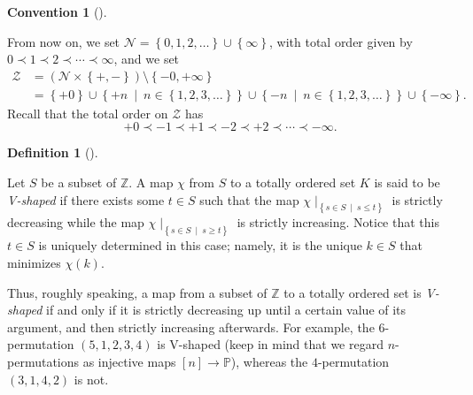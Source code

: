 \documentclass[numbers=enddot,12pt,final,onecolumn,notitlepage]{scrartcl}%
\theoremstyle{definition}
\newtheorem{defi}[theo]{Definition}
\newenvironment{definition}[1][]
{\begin{defi}[#1]\begin{leftbar}}
{\end{leftbar}\end{defi}}
\newtheorem{conv}[theo]{Convention}
\newenvironment{convention}[1][]
{\begin{conv}[#1]\begin{leftbar}}
{\end{leftbar}\end{conv}}
\newenvironment{convention}[1][Convention]{\noindent\textbf{#1.} }{\ \rule{0.5em}{0.5em}}
\newcommand{\ZZ}{\mathbb{Z}}
\begin{document}
\begin{convention}
From now on, we set $\mathcal{N}=\left\{  0,1,2,\ldots\right\}  \cup\left\{
\infty\right\}  $, with total order given by $0\prec1\prec2\prec\cdots
\prec\infty$, and we set
\begin{align*}
\mathcal{Z}  &  =\left(  \mathcal{N}\times\left\{  +,-\right\}  \right)
\setminus\left\{  -0,+\infty\right\} \\
&  =\left\{  +0\right\}  \cup\left\{  +n\ \mid\ n\in\left\{  1,2,3,\ldots
\right\}  \right\}  \cup\left\{  -n\ \mid\ n\in\left\{  1,2,3,\ldots\right\}
\right\}  \cup\left\{  -\infty\right\}  .
\end{align*}
Recall that the total order on $\mathcal{Z}$ has%
\[
+0\prec-1\prec+1\prec-2\prec+2\prec\cdots\prec-\infty.
\]

\end{convention}

\begin{definition}
Let $S$ be a subset of $\mathbb{Z}$.
A map $\chi$ from $S$ to a totally ordered set $K$ is
said to be \textit{V-shaped} if there exists some $t\in S$ such that the map
$\chi\mid_{\left\{  s\in S\ \mid\ s\leq t\right\}  }$ is strictly decreasing
while the map $\chi\mid_{\left\{  s\in S\ \mid\ s\geq t\right\}  }$ is
strictly increasing. Notice that this $t\in S$ is uniquely determined in this
case; namely, it is the unique $k\in S$ that minimizes $\chi\left(  k\right)
$.
\end{definition}

Thus, roughly speaking, a map from a subset of $\ZZ$ to a totally
ordered set is \textit{V-shaped}
if and only if it is strictly decreasing up until a certain value of its
argument, and then strictly increasing afterwards.
For example, the $6$-permutation $\left(5, 1, 2, 3, 4\right)$ is V-shaped
(keep in mind that we regard $n$-permutations as injective maps
$\left[n\right] \to \mathbb{P}$), whereas the $4$-permutation
$\left(3, 1, 4, 2\right)$ is not.
\end{document}
